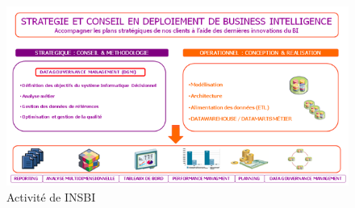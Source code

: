 \begin{figure}[h]
	\begin{center}
		\includegraphics[scale=0.85]{images/deuxieme.png}
		\caption{Activité de INSBI}
		\label{synthese-cout-salarie}
	\end{center}
\end{figure}










